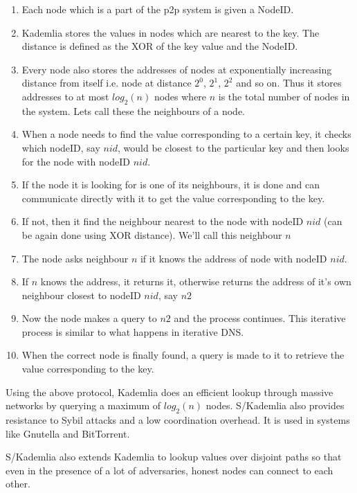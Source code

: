 \begin{enumerate}
    \item Each node which is a part of the p2p system is given a NodeID.
    \item Kademlia stores the values in nodes which are nearest to the key. The distance is defined as the XOR of the key value and the NodeID.
    \item Every node also stores the addresses of nodes at exponentially increasing distance from itself i.e. node at distance $2^0$, $2^1$, $2^2$ and so on. Thus it stores addresses to at most $log_2(n)$ nodes where $n$ is the total number of nodes in the system. Lets call these the neighbours of a node.
    \item When a node needs to find the value corresponding to a certain key, it checks which nodeID, say $nid$, would be closest to the particular key and then looks for the node with nodeID $nid$.
    \item If the node it is looking for is one of its neighbours, it is done and can communicate directly with it to get the value corresponding to the key.
    \item If not, then it find the neighbour nearest to the node with nodeID $nid$ (can be again done using XOR distance). We'll call this neighbour $n$
    \item The node asks neighbour $n$ if it knows the address of node with nodeID $nid$.
    \item If $n$ knows the address, it returns it, otherwise returns the address of it's own neighbour closest to nodeID $nid$, say $n2$
    \item Now the node makes a query to $n2$ and the process continues. This iterative process is similar to what happens in iterative DNS.
    \item When the correct node is finally found, a query is made to it to retrieve the value corresponding to the key.
\end{enumerate}

Using the above protocol, Kademlia does an efficient lookup through massive networks by querying a maximum of $log_2(n)$ nodes. S/Kademlia also provides resistance to Sybil attacks and a low coordination overhead. It is used in systems like Gnutella and BitTorrent.

S/Kademlia\cite{Pecori:2016:SKA:2884080.2884249} also extends Kademlia to lookup values over disjoint paths so that even in the presence of a lot of adversaries, honest nodes can connect to each other.

